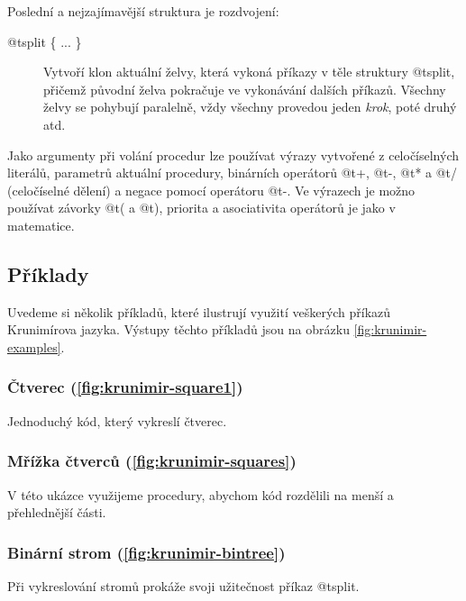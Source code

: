 Poslední a nejzajímavější struktura je rozdvojení:

\begin{description}
\item[@t{split \{ ... \}}] Vytvoří klon aktuální želvy, která vykoná
příkazy v těle struktury @t{split}, přičemž původní želva pokračuje ve vykonávání
dalších příkazů. Všechny želvy se pohybují paralelně, vždy všechny provedou
jeden \emph{krok}, poté druhý atd.
\end{description}

Jako argumenty při volání procedur lze používat výrazy vytvořené z celočíselných
literálů, parametrů aktuální procedury, binárních operátorů @t{+}, @t{-},
@t{*} a @t{/} (celočíselné dělení) a negace pomocí operátoru
@t{-}. Ve výrazech je možno používat závorky @t{(} a @t{)},
priorita a asociativita operátorů je jako v matematice.

\subsection{Příklady}

Uvedeme si několik příkladů, které ilustrují využití veškerých příkazů
Krunimírova jazyka. Výstupy těchto příkladů jsou na obrázku
\ref{fig:krunimir-examples}.

\subsubsection{Čtverec (\ref{fig:krunimir-square1})}

Jednoduchý kód, který vykreslí čtverec. 


\subsubsection{Mřížka čtverců (\ref{fig:krunimir-squares})}

V této ukázce využijeme procedury, abychom kód rozdělili na menší a přehlednější
části.


\subsubsection{Binární strom (\ref{fig:krunimir-bintree})}

Při vykreslování stromů prokáže svoji užitečnost příkaz @t{split}.


